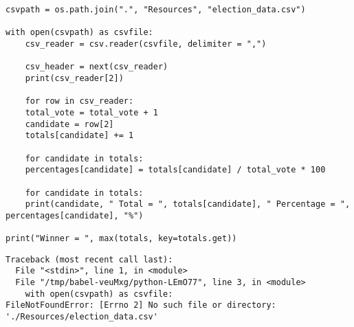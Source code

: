 \documentclass[11pt]{article}
\begin{document}
\begin{verbatim}
csvpath = os.path.join(".", "Resources", "election_data.csv")  

with open(csvpath) as csvfile:
    csv_reader = csv.reader(csvfile, delimiter = ",")

    csv_header = next(csv_reader)
    print(csv_reader[2])

    for row in csv_reader:
	total_vote = total_vote + 1
	candidate = row[2]
	totals[candidate] += 1

    for candidate in totals:
	percentages[candidate] = totals[candidate] / total_vote * 100

    for candidate in totals:
	print(candidate, " Total = ", totals[candidate], " Percentage = ", percentages[candidate], "%")

print("Winner = ", max(totals, key=totals.get))
\end{verbatim}

\begin{verbatim}
Traceback (most recent call last):
  File "<stdin>", line 1, in <module>
  File "/tmp/babel-veuMxg/python-LEmO77", line 3, in <module>
    with open(csvpath) as csvfile:
FileNotFoundError: [Errno 2] No such file or directory: './Resources/election_data.csv'


\end{verbatim}
\end{document}
